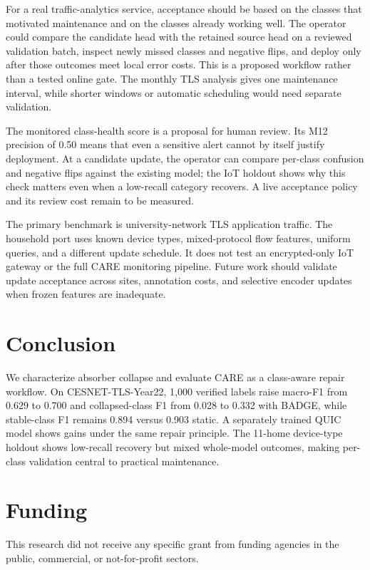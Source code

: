 \documentclass[journal]{IEEEtran}
\begin{document}
For a real traffic-analytics service, acceptance should be based on the classes that motivated maintenance and on the classes already working well. The operator could compare the candidate head with the retained source head on a reviewed validation batch, inspect newly missed classes and negative flips, and deploy only after those outcomes meet local error costs. This is a proposed workflow rather than a tested online gate. The monthly TLS analysis gives one maintenance interval, while shorter windows or automatic scheduling would need separate validation.

The monitored class-health score is a proposal for human review. Its M12 precision of 0.50 means that even a sensitive alert cannot by itself justify deployment. At a candidate update, the operator can compare per-class confusion and negative flips against the existing model; the IoT holdout shows why this check matters even when a low-recall category recovers. A live acceptance policy and its review cost remain to be measured.

The primary benchmark is university-network TLS application traffic. The household port uses known device types, mixed-protocol flow features, uniform queries, and a different update schedule. It does not test an encrypted-only IoT gateway or the full CARE monitoring pipeline. Future work should validate update acceptance across sites, annotation costs, and selective encoder updates when frozen features are inadequate.



\section{Conclusion}
\label{sec:conclusion}

We characterize absorber collapse and evaluate CARE as a class-aware repair workflow. On CESNET-TLS-Year22, 1{,}000 verified labels raise macro-F1 from 0.629 to 0.700 and collapsed-class F1 from 0.028 to 0.332 with BADGE, while stable-class F1 remains 0.894 versus 0.903 static. A separately trained QUIC model shows gains under the same repair principle. The 11-home device-type holdout shows low-recall recovery but mixed whole-model outcomes, making per-class validation central to practical maintenance.

\section*{Funding}
This research did not receive any specific grant from funding agencies in the public, commercial, or not-for-profit sectors.
\end{document}
